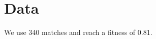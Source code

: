 \documentclass{article}
\begin{document}
\begin{abstract}
We study 550 matches and reach a fitness of 0.81.
\end{abstract}
\section{Data}
We use 340 matches and reach a fitness of 0.81.
\end{document}
